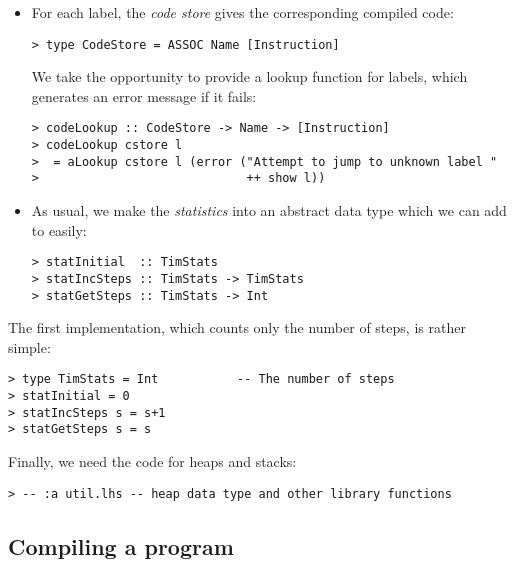 \begin{itemize}
%
%
%
%
%
\item
For each label, the {\em code store\/} gives the corresponding compiled code:
\begin{verbatim}
> type CodeStore = ASSOC Name [Instruction]
\end{verbatim}
%
We take the opportunity to provide a lookup function for
labels, which generates an error message if it fails:
\begin{verbatim}
> codeLookup :: CodeStore -> Name -> [Instruction]
> codeLookup cstore l
>  = aLookup cstore l (error ("Attempt to jump to unknown label "
>                             ++ show l))
\end{verbatim}
%
%
\item
As usual, we make the {\em statistics\/} into an abstract data type which we
can add to easily:
\begin{verbatim}
> statInitial  :: TimStats
> statIncSteps :: TimStats -> TimStats
> statGetSteps :: TimStats -> Int
\end{verbatim}
%
%
%
\end{itemize}
The first implementation, which counts only the number of steps,
is rather simple:
\begin{verbatim}
> type TimStats = Int           -- The number of steps
> statInitial = 0
> statIncSteps s = s+1
> statGetSteps s = s
\end{verbatim}
%
%
%
%
Finally, we need the code for heaps and stacks:
\begin{verbatim}
> -- :a util.lhs -- heap data type and other library functions
\end{verbatim}
\subsection{Compiling a program}
\label{sect:tim:compiler}

